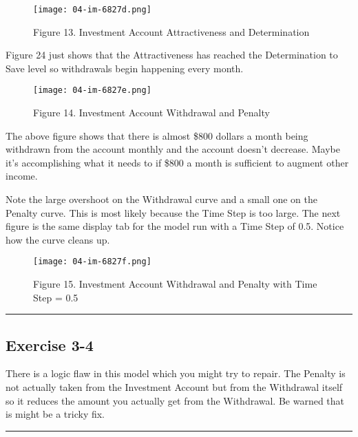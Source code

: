 \documentclass[]{memoir}
\let\Oldincludegraphics\includegraphics
\renewcommand{\includegraphics}[1]{\Oldincludegraphics[max size={\textwidth}{\textheight}]{#1}}
\begin{document}
\begin{figure}[htbp]
\centering
\texttt{[image: 04-im-6827d.png]}
\caption{Figure 13. Investment Account Attractiveness and Determination}
\end{figure}

Figure 24 just shows that the Attractiveness has reached the
Determination to Save level so withdrawals begin happening every month.

\begin{figure}[htbp]
\centering
\texttt{[image: 04-im-6827e.png]}
\caption{Figure 14. Investment Account Withdrawal and Penalty}
\end{figure}

The above figure shows that there is almost \$800 dollars a month being
withdrawn from the account monthly and the account doesn't decrease.
Maybe it's accomplishing what it needs to if \$800 a month is sufficient
to augment other income.

Note the large overshoot on the Withdrawal curve and a small one on the
Penalty curve. This is most likely because the Time Step is too large.
The next figure is the same display tab for the model run with a Time
Step of 0.5. Notice how the curve cleans up.

\begin{figure}[htbp]
\centering
\texttt{[image: 04-im-6827f.png]}
\caption{Figure 15. Investment Account Withdrawal and Penalty with Time
Step = 0.5}
\end{figure}

\begin{center}\rule{3in}{0.4pt}\end{center}

\subsection{Exercise 3-4}

There is a logic flaw in this model which you might try to repair. The
Penalty is not actually taken from the Investment Account but from the
Withdrawal itself so it reduces the amount you actually get from the
Withdrawal. Be warned that is might be a tricky fix.

\begin{center}\rule{3in}{0.4pt}\end{center}
\end{document}
